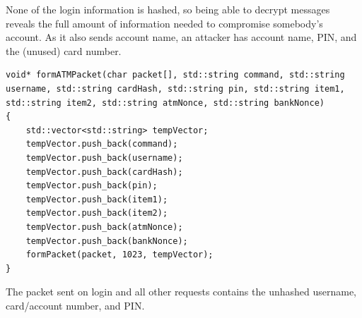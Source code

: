 \documentclass{article}
\begin{document}
None of the login information is hashed, so being able to decrypt messages reveals 
the full amount of information needed to compromise somebody's account. As it also 
sends account name, an attacker has account name, PIN, and the (unused) card number.
\begin{lstlisting}
void* formATMPacket(char packet[], std::string command, std::string username, std::string cardHash, std::string pin, std::string item1, std::string item2, std::string atmNonce, std::string bankNonce)
{
    std::vector<std::string> tempVector;
    tempVector.push_back(command);
    tempVector.push_back(username);
    tempVector.push_back(cardHash);
    tempVector.push_back(pin);
    tempVector.push_back(item1);
    tempVector.push_back(item2);
    tempVector.push_back(atmNonce);
    tempVector.push_back(bankNonce);
    formPacket(packet, 1023, tempVector);
}
\end{lstlisting}
The packet sent on login and all other requests contains the unhashed username, card/account number, and PIN.
\end{document}
